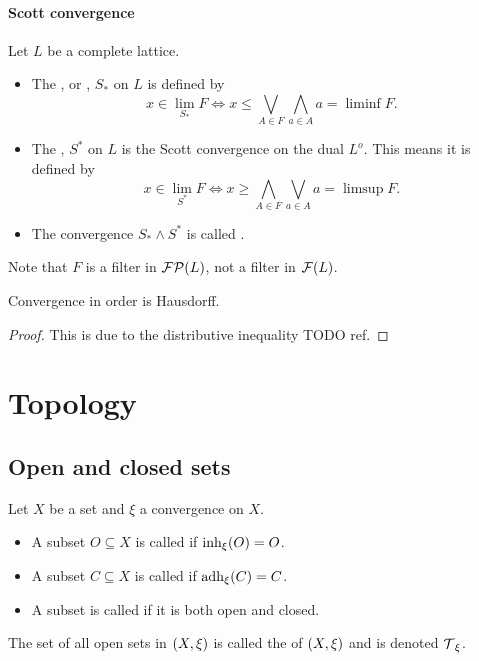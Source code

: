 \subsubsection{Scott convergence}

\begin{definition}
Let $L$ be a complete lattice.
\begin{itemize}
\item The , or , $S_*$ on $L$ is defined by
\[ x \in \lim_{S_*} F \iff x \leq \bigvee_{A\in F}\bigwedge_{a\in A}a = \liminf F. \]

\item The , $S^*$ on $L$ is the Scott convergence on the dual $L^o$. This means it is defined by
\[ x \in \lim_{S^*} F \iff x \geq \bigwedge_{A\in F}\bigvee_{a\in A}a = \limsup F. \]
\item The convergence $S_* \wedge S^*$ is called .
\end{itemize}
\end{definition}
Note that $F$ is a filter in $\operatorname{\mathcal{FP}}(L)$, not a filter in $\operatorname{\mathcal{F}}(L)$.

\begin{proposition}
Convergence in order is Hausdorff.
\end{proposition}
\begin{proof}
This is due to the distributive inequality TODO ref.
\end{proof}

\chapter{Topology}
\section{Open and closed sets}
\begin{definition}
Let $X$ be a set and $\xi$ a convergence on $X$.
\begin{itemize}
    \item A subset $O \subseteq X$ is called  if $\operatorname{inh}_\xi(O) = O$.
    \item A subset $C \subseteq X$ is called  if $\operatorname{adh}_\xi(C) = C$.
    \item A subset is called  if it is both open and closed.
\end{itemize}
The set of all open sets in $\left( X,\xi \right)$ is called the  of $\left( X,\xi \right)$ and is denoted $\operatorname{\mathcal{T}}_\xi$.
\end{definition}


